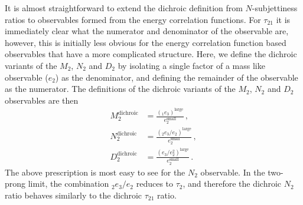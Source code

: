 \documentclass[11pt]{cernrep}
\begin{document}
It is almost straightforward to extend the dichroic definition from $N$-subjettiness ratios to observables formed from the energy correlation functions.
%
For $\tau_{21}$ it is immediately clear what the numerator and denominator of the observable are, however, this is initially less obvious for the energy correlation function based observables that have a more complicated structure.
%
Here, we define the dichroic variants of the $M_2$, $N_2$ and $D_2$ by isolating a single factor of a mass like observable ($e_2$) as the denominator, and defining the remainder of the observable as the numerator.
%
The definitions of the dichroic variants of the $M_2$, $N_2$ and $D_2$
observables are then
\begin{align}
  M_2^{\text{dichroic}}&= \frac{( _1e_{3})^{\text{large}}  }{e_{2}^{\text{small}}}\,, \\
 N_2^{\text{dichroic}}&= \frac{\left( _{2}e_{3} / e_{2} \right)^{\text{large}} }{e_{2}^{\text{small}}}\,,\\
  D_2^{\text{dichroic}}&=\frac{\left( e_{3} / e_{2}^2 \right)^{\text{large}}}{ e_{2}^{\text{small}}}\,.
\end{align}
%
%
The above prescription is most easy to see for the $N_2$ observable. In the two-prong limit, the combination $ _{2}e_{3} / e_{2} $ reduces to $\tau_2$, and therefore the dichroic $N_2$ ratio behaves similarly to the dichroic $\tau_{21}$ ratio.
\end{document}
